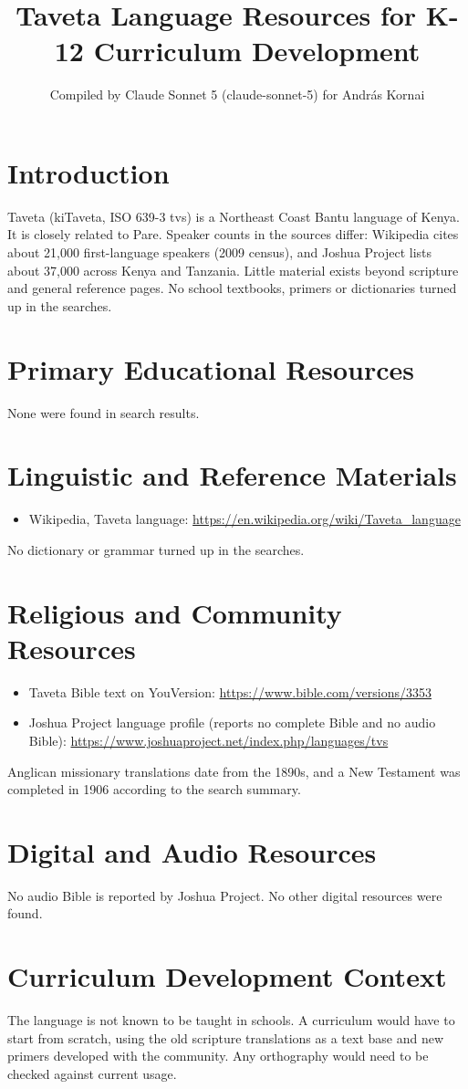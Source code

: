 \documentclass[12pt]{article}
\title{Taveta Language Resources for K-12 Curriculum Development}
\author{Compiled by Claude Sonnet 5 (claude-sonnet-5) for Andr\'as Kornai}
\date{}
\begin{document}
\maketitle

\section{Introduction}
Taveta (kiTaveta, ISO 639-3 tvs) is a Northeast Coast Bantu language of Kenya. It is closely related to Pare. Speaker counts in the sources differ: Wikipedia cites about 21,000 first-language speakers (2009 census), and Joshua Project lists about 37,000 across Kenya and Tanzania. Little material exists beyond scripture and general reference pages. No school textbooks, primers or dictionaries turned up in the searches.

\section{Primary Educational Resources}
None were found in search results.

\section{Linguistic and Reference Materials}
\begin{itemize}
\item Wikipedia, Taveta language: \url{https://en.wikipedia.org/wiki/Taveta_language}
\end{itemize}
No dictionary or grammar turned up in the searches.

\section{Religious and Community Resources}
\begin{itemize}
\item Taveta Bible text on YouVersion: \url{https://www.bible.com/versions/3353}
\item Joshua Project language profile (reports no complete Bible and no audio Bible): \url{https://www.joshuaproject.net/index.php/languages/tvs}
\end{itemize}
Anglican missionary translations date from the 1890s, and a New Testament was completed in 1906 according to the search summary.

\section{Digital and Audio Resources}
No audio Bible is reported by Joshua Project. No other digital resources were found.

\section{Curriculum Development Context}
The language is not known to be taught in schools. A curriculum would have to start from scratch, using the old scripture translations as a text base and new primers developed with the community. Any orthography would need to be checked against current usage.
\end{document}
